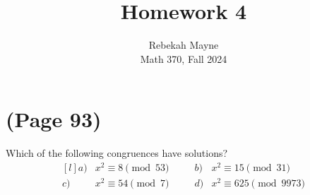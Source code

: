 \documentclass[11pt]{article}
\newenvironment{problem}[2][Problem]{\begin{trivlist}
\item[\hskip \labelsep {\bfseries #1}\hskip \labelsep {\bfseries #2.}]}{\end{trivlist}}
\begin{document}
\title{Homework 4}
\author{Rebekah Mayne\\
  Math 370, Fall 2024}
\maketitle


\section{(Page 93)}

\begin{problem}{2}
Which of the following congruences have solutions?
\[
  \begin{matrix*}[l]
    a) & x^2\equiv 8 \pmod{53} & \phantom{sp} & b) & x^2\equiv 15\pmod{31}    \\
    c) & x^2\equiv 54 \pmod{7} &              & d) & x^2\equiv 625\pmod{9973} \\
  \end{matrix*}
\]
\end{problem}
\end{document}
